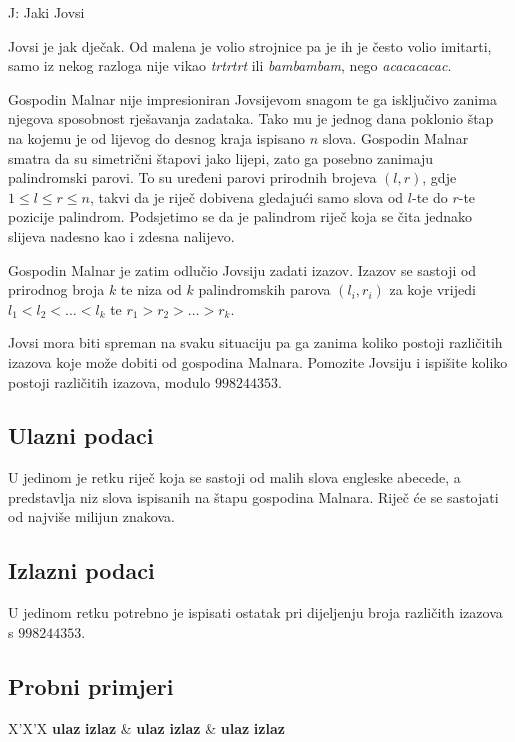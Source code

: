 \begin{statement}[
  timelimit=1 s,
  memorylimit=512 MiB,
]{J: Jaki Jovsi}

Jovsi je jak dječak. Od malena je volio strojnice pa je ih je često volio
imitarti, samo iz nekog razloga nije vikao \textit{trtrtrt} ili
\textit{bambambam}, nego \textit{acacacacac}.

Gospodin Malnar nije impresioniran Jovsijevom snagom te ga isključivo zanima
njegova sposobnost
rješavanja zadataka. Tako mu je jednog dana poklonio štap na kojemu je od
lijevog do desnog kraja ispisano $n$ slova. Gospodin Malnar smatra da su simetrični
štapovi jako lijepi, zato ga posebno zanimaju palindromski parovi. To su uređeni
parovi prirodnih brojeva $(l, r)$, gdje $1 \le l \le r \le n$, takvi da je riječ
dobivena gledajući samo slova od $l$-te do $r$-te pozicije palindrom.
Podsjetimo se da je palindrom riječ koja se čita jednako slijeva nadesno kao i
zdesna nalijevo.

Gospodin Malnar je zatim odlučio Jovsiju zadati izazov. Izazov se sastoji od prirodnog
broja $k$ te niza od $k$ palindromskih parova $(l_i, r_i)$ za koje vrijedi
$l_1 < l_2 < \dots < l_k$ te $r_1 > r_2 > \dots > r_k$.

Jovsi mora biti spreman na svaku situaciju pa ga zanima koliko postoji
različitih izazova koje može dobiti od gospodina Malnara. Pomozite Jovsiju i
ispišite koliko postoji različitih izazova, modulo $998244353$.

\subsection*{Ulazni podaci}
U jedinom je retku riječ koja se sastoji od malih slova engleske abecede, a
predstavlja niz slova ispisanih na štapu gospodina Malnara. Riječ će se sastojati
od najviše milijun znakova.

\subsection*{Izlazni podaci}
U jedinom retku potrebno je ispisati ostatak pri dijeljenju broja različith
izazova s $998244353$.

\subsection*{Probni primjeri}
\begin{tabularx}{\textwidth}{X'X'X}
  \textbf{ulaz}
  \linespread{1}{}
  \textbf{izlaz}
  \linespread{1}{} &
  \textbf{ulaz}
  \linespread{1}{}
  \textbf{izlaz}
  \linespread{1}{} &
  \textbf{ulaz}
  \linespread{1}{}
  \textbf{izlaz}
  \linespread{1}{}
\end{tabularx}


\end{statement}
